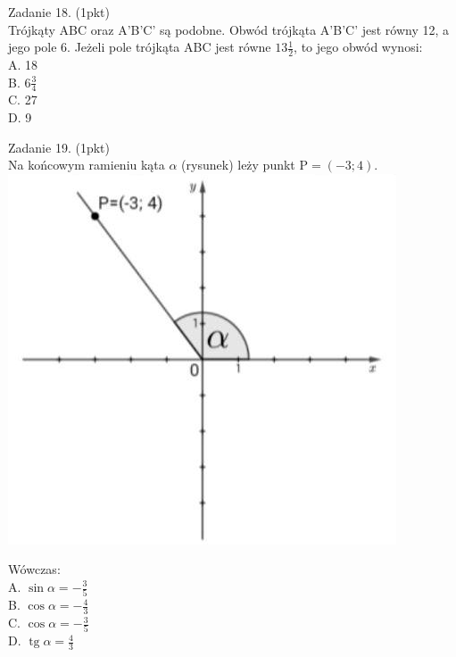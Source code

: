 \documentclass[10pt]{article}
\begin{document}
Zadanie 18. (1pkt)\\
Trójkąty ABC oraz A'B'C' są podobne. Obwód trójkąta A'B'C' jest równy 12, a jego pole 6. Jeżeli pole trójkąta ABC jest równe \(13 \frac{1}{2}\), to jego obwód wynosi:\\
A. 18\\
B. \(6 \frac{3}{4}\)\\
C. 27\\
D. 9

Zadanie 19. (1pkt)\\
Na końcowym ramieniu kąta \(\alpha\) (rysunek) leży punkt \(\mathrm{P}=(-3 ; 4)\).\\
\includegraphics[max width=\textwidth, center]{2024_11_21_0fa17f80dfe1c6bd3b66g-06}

Wówczas:\\
A. \(\sin \alpha=-\frac{3}{5}\)\\
B. \(\cos \alpha=-\frac{4}{3}\)\\
C. \(\cos \alpha=-\frac{3}{5}\)\\
D. \(\operatorname{tg} \alpha=\frac{4}{3}\)
\end{document}
